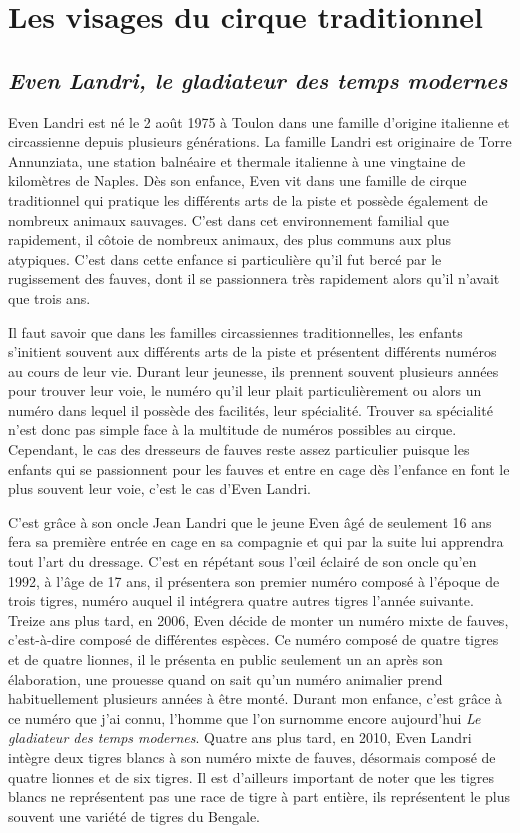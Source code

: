 \chapter{Les visages du cirque traditionnel}
\section*{\textit{Even Landri, le gladiateur des temps modernes}}
{}

Even Landri est né le 2 août 1975 à Toulon dans une famille d'origine italienne et circassienne depuis plusieurs générations. La famille Landri est originaire de Torre Annunziata, une station balnéaire et thermale italienne à une vingtaine de kilomètres de Naples. Dès son enfance, Even vit dans une famille de cirque traditionnel qui pratique les différents arts de la piste et possède également de nombreux animaux sauvages. C'est dans cet environnement familial que rapidement, il côtoie de nombreux animaux, des plus communs aux plus atypiques. C'est dans cette enfance si particulière qu'il fut bercé par le rugissement des fauves, dont il se passionnera très rapidement alors qu'il n'avait que trois ans.

Il faut savoir que dans les familles circassiennes traditionnelles, les enfants s'initient souvent aux différents arts de la piste et présentent différents numéros au cours de leur vie. Durant leur jeunesse, ils prennent souvent plusieurs années pour trouver leur voie, le numéro qu'il leur plait particulièrement ou alors un numéro dans lequel il possède des facilités, leur spécialité. Trouver sa spécialité n'est donc pas simple face à la multitude de numéros possibles au cirque. Cependant, le cas des dresseurs de fauves reste assez particulier puisque les enfants qui se passionnent pour les fauves et entre en cage dès l'enfance en font le plus souvent leur voie, c'est le cas d'Even Landri. 

C'est grâce à son oncle Jean Landri que le jeune Even âgé de seulement 16 ans fera sa première entrée en cage en sa compagnie et qui par la suite lui apprendra tout l'art du dressage. C'est en répétant sous l'œil éclairé de son oncle qu’en 1992, à l'âge de 17 ans, il présentera son premier numéro composé à l'époque de trois tigres, numéro auquel il intégrera quatre autres tigres l'année suivante. Treize ans plus tard, en 2006, Even décide de monter un numéro mixte de fauves, c’est-à-dire composé de différentes espèces. Ce numéro composé de quatre tigres et de quatre lionnes, il le présenta en public seulement un an après son élaboration, une prouesse quand on sait qu'un numéro animalier prend habituellement plusieurs années à être monté. Durant mon enfance, c'est grâce à ce numéro que j'ai connu, l'homme que l'on surnomme encore aujourd'hui \textit{Le gladiateur des temps modernes}. Quatre ans plus tard, en 2010, Even Landri intègre deux tigres blancs à son numéro mixte de fauves, désormais composé de quatre lionnes et de six tigres. Il est d'ailleurs important de noter que les tigres blancs ne représentent pas une race de tigre à part entière, ils représentent le plus souvent une variété de tigres du Bengale. 

